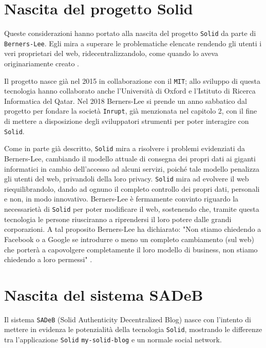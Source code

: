 \bigskip

\section{Nascita del progetto Solid}

\medskip

Queste considerazioni hanno portato alla nascita del progetto {\tt Solid} da parte di {\tt Berners-Lee}. Egli mira a superare le problematiche elencate rendendo gli utenti i veri proprietari del web, ridecentralizzandolo, come quando lo aveva originariamente creato \cite{techchahiye}.

\medskip

Il progetto nasce già nel 2015 in collaborazione con il {\tt MIT}; allo sviluppo di questa tecnologia hanno collaborato anche l'Università di Oxford e l'Istituto di Ricerca Informatica del Qatar. Nel 2018 Berners-Lee si prende un anno sabbatico dal progetto per fondare la società {\tt Inrupt}, già menzionata nel capitolo 2, con il fine di mettere a disposizione degli sviluppatori strumenti per poter interagire con {\tt Solid}.

\medskip

Come in parte già descritto, {\tt Solid} mira a risolvere i problemi evidenziati da Berners-Lee, cambiando il modello attuale di consegna dei propri dati ai giganti informatici in cambio dell'accesso ad alcuni servizi, poiché tale modello penalizza gli utenti del web, privandoli della loro privacy. {\tt Solid} mira ad evolvere il web riequilibrandolo, dando ad ognuno il completo controllo dei propri dati, personali e non, in modo innovativo. Berners-Lee è fermamente convinto riguardo la necessarietà di {\tt Solid} per poter modificare il web, sostenendo che, tramite questa tecnologia le persone riusciranno a riprendersi il loro potere dalle grandi corporazioni. A tal proposito Berners-Lee ha dichiarato: "Non stiamo chiedendo a Facebook o a Google se introdurre o meno un completo cambiamento (sul web) che porterà a capovolgere completamente il loro modello di business, non stiamo chiedendo a loro permessi" \cite{fastcompany}.


\bigskip

\section{Nascita del sistema SADeB}

\medskip

Il sistema {\tt SADeB} (Solid Authenticity Decentralized Blog) nasce con l'intento di mettere in evidenza le potenzialità della tecnologia {\tt Solid}, mostrando le differenze tra l'applicazione {\tt Solid} {\tt my-solid-blog} e un normale social network.

